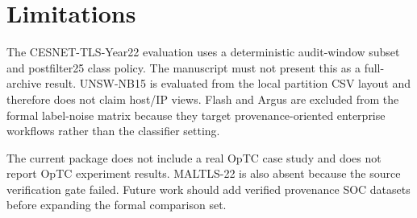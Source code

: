 \section{Limitations}
The CESNET-TLS-Year22 evaluation uses a deterministic audit-window subset and postfilter25 class policy. The manuscript must not present this as a full-archive result. UNSW-NB15 is evaluated from the local partition CSV layout and therefore does not claim host/IP views. Flash and Argus are excluded from the formal label-noise matrix because they target provenance-oriented enterprise workflows rather than the classifier setting.

The current package does not include a real OpTC case study and does not report OpTC experiment results. MALTLS-22 is also absent because the source verification gate failed. Future work should add verified provenance SOC datasets before expanding the formal comparison set.
